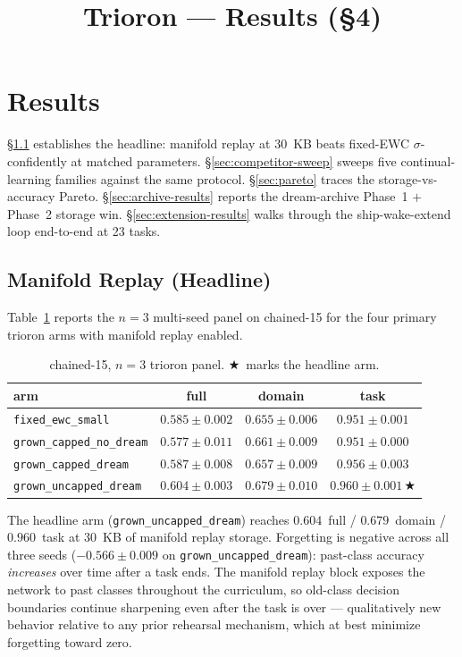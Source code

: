 \documentclass[11pt]{article}
\title{Trioron --- Results (\S4)}
\author{}
\date{}
\newcommand{\arm}[1]{\texttt{#1}}
\newcommand{\headline}{$\bigstar$}
\begin{document}
\maketitle

\section{Results}
\label{sec:results}

\S\ref{sec:headline} establishes the headline: manifold replay at 30~KB
beats fixed-EWC $\sigma$-confidently at matched parameters.
\S\ref{sec:competitor-sweep} sweeps five continual-learning families
against the same protocol. \S\ref{sec:pareto} traces the
storage-vs-accuracy Pareto. \S\ref{sec:archive-results} reports the
dream-archive Phase~1 $+$ Phase~2 storage win.
\S\ref{sec:extension-results} walks through the ship-wake-extend loop
end-to-end at 23 tasks.

\subsection{Manifold Replay (Headline)}
\label{sec:headline}

Table~\ref{tab:trioron-panel} reports the $n = 3$ multi-seed panel on
chained-15 for the four primary trioron arms with manifold replay enabled.

\begin{table}[h]
  \centering
  \caption{chained-15, $n = 3$ trioron panel. \headline\ marks the headline arm.}
  \label{tab:trioron-panel}
  \begin{tabular}{lccc}
    \toprule
    arm                              & full              & domain            & task              \\
    \midrule
    \arm{fixed\_ewc\_small}          & $0.585 \pm 0.002$ & $0.655 \pm 0.006$ & $0.951 \pm 0.001$ \\
    \arm{grown\_capped\_no\_dream}   & $0.577 \pm 0.011$ & $0.661 \pm 0.009$ & $0.951 \pm 0.000$ \\
    \arm{grown\_capped\_dream}       & $0.587 \pm 0.008$ & $0.657 \pm 0.009$ & $0.956 \pm 0.003$ \\
    \arm{grown\_uncapped\_dream}     & $0.604 \pm 0.003$ & $0.679 \pm 0.010$ & $0.960 \pm 0.001$\,\headline \\
    \bottomrule
  \end{tabular}
\end{table}

The headline arm (\arm{grown\_uncapped\_dream}) reaches $0.604$~full /
$0.679$~domain / $0.960$~task at 30~KB of manifold replay storage.
Forgetting is negative across all three seeds ($-0.566 \pm 0.009$ on
\arm{grown\_uncapped\_dream}): past-class accuracy \emph{increases} over
time after a task ends. The manifold replay block exposes the network to
past classes throughout the curriculum, so old-class decision boundaries
continue sharpening even after the task is over --- qualitatively new
behavior relative to any prior rehearsal mechanism, which at best minimize
forgetting toward zero.
\end{document}
